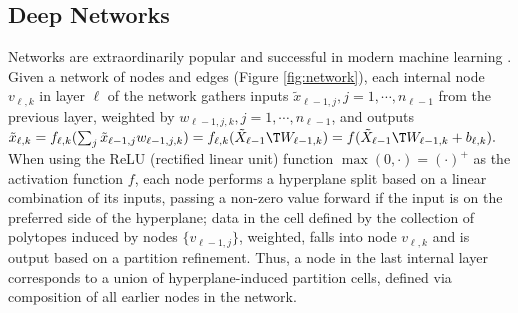 \subsection{Deep Networks}
Networks are extraordinarily popular and successful in modern machine learning \citep{lecun2015deeplearning, SzeChe17Efficient, MPCB2014, M2017}.
Given a network of nodes and edges (Figure \ref{fig:network}), each internal node $v_{\ell,k}$ in layer $\ell$ of the network gathers inputs $\tilde{x}_{\ell-1,j}, j=1,\cdots,n_{\ell-1}$ from the previous layer, weighted by $w_{\ell-1,j,k}, j=1,\cdots,n_{\ell-1}$, and outputs 
$
\tilde{x}_{\ell,k} 
= f_{\ell,k}(\sum_j \tilde{x}_{\ell-1,j} w_{\ell-1,j,k})
= f_{\ell,k}(\tilde{X}_{\ell-1}\T W_{\ell-1,k})
= f(\tilde{X}_{\ell-1}\T W_{\ell-1,k} + b_{\ell,k}).
$
When using the ReLU (rectified linear unit) function $\max(0,\cdot) = (\cdot)^+$ as the activation function $f$, each node performs a hyperplane split based on a linear combination of its inputs, passing a non-zero value forward if the input is on the preferred side of the hyperplane; data in the cell defined by the collection of polytopes induced by nodes $\{v_{\ell-1,j}\}$, weighted, falls into node $v_{\ell,k}$
and is output based on a partition refinement.
Thus, a node in the last internal layer corresponds to a union of hyperplane-induced partition cells, defined via composition of all earlier nodes in the network.

